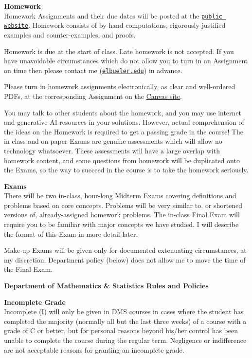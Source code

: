 \documentclass[12pt]{article}
\renewcommand{\emph}[1]{\textsf{\textbf{#1}}}
\newcommand{\localhead}[1]{\par\smallskip\textbf{#1} \smallskip\nobreak\\}%
\def\heading#1{\localhead{\large\emph{#1}}}
\def\subheading#1{\localhead{\emph{#1}}}
\begin{document}
\heading{Homework}
Homework Assignments and their due dates will be posted at the \href{https://bueler.github.io/fa/}{\texttt{public website}}.  Homework consists of by-hand computations, rigorously-justified examples and counter-examples, and proofs.

Homework is due at the start of class.  Late homework is not accepted.  If you have unavoidable circumstances which do not allow you to turn in an Assignment on time then please contact me (\href{mailto:elbueler@alaska.edu}{\texttt{elbueler\@@alaska.edu}}) in advance.

Please turn in homework assignments electronically, as clear and well-ordered PDFs, at the corresponding Assignment on the \href{https://canvas.alaska.edu/courses/30068}{Canvas site}.

You may talk to other students about the homework, and you may use internet and generative AI resources in your solutions.  However, actual comprehension of the ideas on the Homework is required to get a passing grade in the course!  The in-class and on-paper Exams are genuine assessments which will allow no technology whatsoever.  These assessments will have a large overlap with homework content, and some questions from homework will be duplicated onto the Exams, so the way to succeed in the course is to take the homework seriously.

\heading{Exams}
There will be two in-class, hour-long Midterm Exams covering definitions and problems based on core concepts.  Problems will be very similar to, or shortened versions of, already-assigned homework problems.  The in-class Final Exam will require you to be familiar with major concepts we have studied.  I will describe the format of this Exam in more detail later.

Make-up Exams will be given only for documented extenuating circumstances, at my discretion.  Department policy (below) does not allow me to move the time of the Final Exam.


\clearpage\newpage
\phantom{foo}
\vskip -20pt

\heading{Department of Mathematics \& Statistics Rules and Policies}

\subheading{Incomplete Grade} 
Incomplete (I) will only be given in
  DMS courses in cases where
  the student has completed the majority (normally all but the last
  three weeks) of a course with a grade of C or better, but for
  personal reasons beyond his/her control has been unable to complete
  the course during the regular term. Negligence or indifference are
  not acceptable reasons for granting an incomplete grade.
\end{document}
